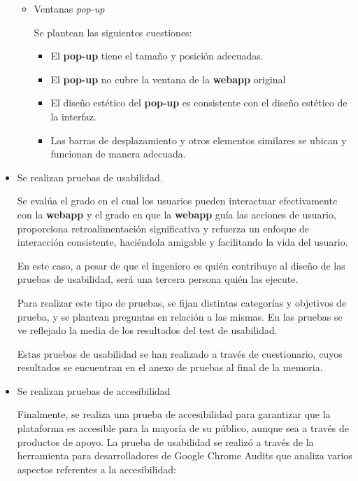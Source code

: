 \begin{itemize}
\begin{itemize}
\item Ventanas \textit{pop-up}


Se plantean las siguientes cuestiones:



\begin{itemize}

\item El \textbf{pop-up} tiene el tamaño y posición adecuadas. 
\item El \textbf{pop-up} no cubre la ventana de la \textbf{webapp} original 
\item El diseño estético del \textbf{pop-up} es consistente con el diseño estético de la interfaz. 
\item Las barras de desplazamiento y otros elementos similares se ubican y funcionan de manera adecuada.
\end{itemize}
\end{itemize}
\item Se realizan pruebas de usabilidad.


Se evalúa el grado en el cual los usuarios pueden interactuar efectivamente con la \textbf{webapp} y el grado en que la \textbf{webapp} guía las acciones de usuario, proporciona retroalimentación significativa y refuerza un enfoque de interacción consistente, haciéndola amigable y facilitando la vida del usuario.


En este caso, a pesar de que el ingeniero es quién contribuye al diseño de las pruebas de usabilidad, será una tercera persona quién las ejecute.


Para realizar este tipo de pruebas, se fijan distintas categorías y objetivos de prueba, y se plantean preguntas en relación a las mismas. En las pruebas se ve reflejado la media de los resultados del test de usabilidad.

Estas pruebas de usabilidad se han realizado a través de cuestionario, cuyos resultados se encuentran en el anexo de pruebas al final de la memoria.

\item Se realizan pruebas de accesibilidad


Finalmente, se realiza una prueba de accesibilidad para garantizar que la plataforma es accesible para la mayoría de su público, aunque sea a través de productos de apoyo. La prueba de usabilidad se realizó a través de la herramienta para desarrolladores de Google Chrome Audits que analiza varios aspectos referentes a la accesibilidad:


\end{itemize}
